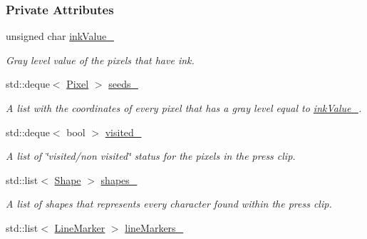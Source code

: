 \subsubsection*{Private Attributes}
\begin{CompactItemize}
\item 
\hypertarget{class_segmenter_fa6183f99aa6011399783652b341a43b}{
unsigned char \hyperlink{class_segmenter_fa6183f99aa6011399783652b341a43b}{inkValue\_\-}}
\label{class_segmenter_fa6183f99aa6011399783652b341a43b}

\begin{CompactList}\small\item\em Gray level value of the pixels that have ink. \item\end{CompactList}\item 
\hypertarget{class_segmenter_7859d050250b9fdf7c96374f80008d6e}{
std::deque$<$ \hyperlink{_shape_8hpp_535e59456e3e633842529cfa8ea103c4}{Pixel} $>$ \hyperlink{class_segmenter_7859d050250b9fdf7c96374f80008d6e}{seeds\_\-}}
\label{class_segmenter_7859d050250b9fdf7c96374f80008d6e}

\begin{CompactList}\small\item\em A list with the coordinates of every pixel that has a gray level equal to \hyperlink{class_segmenter_fa6183f99aa6011399783652b341a43b}{inkValue\_\-}. \item\end{CompactList}\item 
\hypertarget{class_segmenter_fe4dd18749f268aae2b26a1abff6a607}{
std::deque$<$ bool $>$ \hyperlink{class_segmenter_fe4dd18749f268aae2b26a1abff6a607}{visited\_\-}}
\label{class_segmenter_fe4dd18749f268aae2b26a1abff6a607}

\begin{CompactList}\small\item\em A list of \char`\"{}visited/non visited\char`\"{} status for the pixels in the press clip. \item\end{CompactList}\item 
\hypertarget{class_segmenter_41b94ede2829063e0937dc150756e77e}{
std::list$<$ \hyperlink{class_shape}{Shape} $>$ \hyperlink{class_segmenter_41b94ede2829063e0937dc150756e77e}{shapes\_\-}}
\label{class_segmenter_41b94ede2829063e0937dc150756e77e}

\begin{CompactList}\small\item\em A list of shapes that represents every character found within the press clip. \item\end{CompactList}\item 
\hypertarget{class_segmenter_2789fd760ed7604765b3b147be454c09}{
std::list$<$ \hyperlink{class_segmenter_ae134abed2f1d55197820f4027d10999}{LineMarker} $>$ \hyperlink{class_segmenter_2789fd760ed7604765b3b147be454c09}{lineMarkers\_\-}}
\label{class_segmenter_2789fd760ed7604765b3b147be454c09}


\end{CompactItemize}
